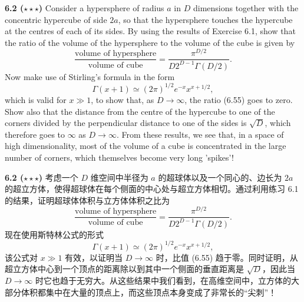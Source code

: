 \documentclass{article}
\begin{document}
\vspace{1em}

\textbf{6.2 ($\star\star\star$)} Consider a hypersphere of radius $a$ in $D$ dimensions together with the concentric hypercube of side $2a$, so that the hypersphere touches the hypercube at the centres of each of its sides. By using the results of Exercise 6.1, show that the ratio of the volume of the hypersphere to the volume of the cube is given by
\begin{equation}
\frac{\text{volume of hypersphere}}{\text{volume of cube}} = \frac{\pi^{D/2}}{D 2^{D-1} \Gamma(D/2)}.
\tag{6.55}
\end{equation}
Now make use of Stirling's formula in the form
\begin{equation}
\Gamma(x+1) \simeq (2\pi)^{1/2} e^{-x} x^{x+1/2},
\tag{6.56}
\end{equation}
which is valid for $x \gg 1$, to show that, as $D \to \infty$, the ratio (6.55) goes to zero. Show also that the distance from the centre of the hypercube to one of the corners divided by the perpendicular distance to one of the sides is $\sqrt{D}$, which therefore goes to $\infty$ as $D \to \infty$. From these results, we see that, in a space of high dimensionality, most of the volume of a cube is concentrated in the large number of corners, which themselves become very long 'spikes'!

\textbf{6.2 ($\star\star\star$)} 考虑一个 $D$ 维空间中半径为 $a$ 的超球体以及一个同心的、边长为 $2a$ 的超立方体，使得超球体在每个侧面的中心处与超立方体相切。通过利用练习 6.1 的结果，证明超球体体积与立方体体积之比为
\begin{equation}
\frac{\text{volume of hypersphere}}{\text{volume of cube}} = \frac{\pi^{D/2}}{D 2^{D-1} \Gamma(D/2)}.
\tag{6.55}
\end{equation}
现在使用斯特林公式的形式
\begin{equation}
\Gamma(x+1) \simeq (2\pi)^{1/2} e^{-x} x^{x+1/2},
\tag{6.56}
\end{equation}
该公式对 $x \gg 1$ 有效，以证明当 $D \to \infty$ 时，比值 (6.55) 趋于零。同时证明，从超立方体中心到一个顶点的距离除以到其中一个侧面的垂直距离是 $\sqrt{D}$，因此当 $D \to \infty$ 时它也趋于无穷大。从这些结果中我们看到，在高维空间中，立方体的大部分体积都集中在大量的顶点上，而这些顶点本身变成了非常长的“尖刺”！

\vspace{1em}
\end{document}
